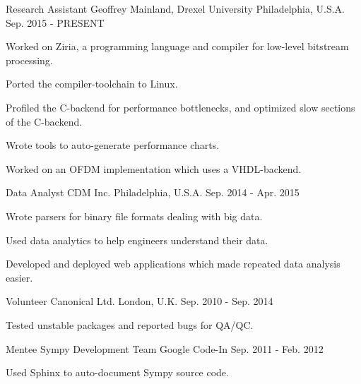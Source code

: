\begin{cventries}
  \cventry
    {Research Assistant}
    {Geoffrey Mainland, Drexel University}
    {Philadelphia, U.S.A.}
    {Sep. 2015 - PRESENT}
    {
      \begin{cvitems}
        \item {Worked on Ziria, a programming language and compiler for low-level bitstream processing.}
        \item {Ported the compiler-toolchain to Linux.}
        \item {Profiled the C-backend for performance bottlenecks, and optimized slow sections of the C-backend.}
        \item {Wrote tools to auto-generate performance charts.}
        \item {Worked on an OFDM implementation which uses a VHDL-backend.}
      \end{cvitems}
    }
  \cventry
    {Data Analyst}
    {CDM Inc.}
    {Philadelphia, U.S.A.}
    {Sep. 2014 - Apr. 2015}
    {
      \begin{cvitems}
        \item {Wrote parsers for binary file formats dealing with big data.}
        \item {Used data analytics to help engineers understand their data.}
        \item {Developed and deployed web applications which made repeated data analysis easier.}
      \end{cvitems}
    }
  \cventry
    {Volunteer}
    {Canonical Ltd.}
    {London, U.K.}
    {Sep. 2010 - Sep. 2014}
    {
      \begin{cvitems}
        \item {Tested unstable packages and reported bugs for QA/QC.}
      \end{cvitems}
    }
  \cventry
    {Mentee}
    {Sympy Development Team}
    {Google Code-In}
    {Sep. 2011 - Feb. 2012}
    {
      \begin{cvitems}
        \item {Used Sphinx to auto-document Sympy source code.}
      \end{cvitems}
    }
\end{cventries}
